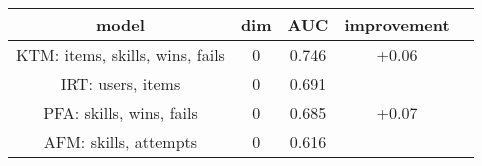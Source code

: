 \begin{tabular}{ccccc}
\toprule
                      model &  dim &             AUC & improvement\\
\midrule
 \alert{KTM: items, skills, wins, fails} &  \alert0 &  \alert{0.746} & \alert{+0.06} \\
 IRT: users, items &  0 &  0.691 & \\
 PFA: skills, wins, fails &  0 &  0.685 & +0.07 \\
 AFM: skills, attempts &  0 &  0.616 &\\ \bottomrule
\end{tabular}
